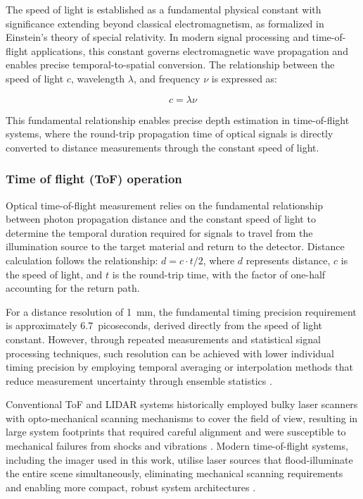\documentclass[12pt,a4paper,oneside]{report}
\begin{document}
The speed of light is established as a fundamental physical constant with significance extending beyond classical electromagnetism, as formalized in Einstein's theory of special relativity. In modern signal processing and time-of-flight applications, this constant governs electromagnetic wave propagation and enables precise temporal-to-spatial conversion. The relationship between the speed of light $c$, wavelength $\lambda$, and frequency $\nu$ is expressed as:

\begin{equation}
c = \lambda \nu
\label{eq:speed_of_light}
\end{equation}

This fundamental relationship enables precise depth estimation in time-of-flight systems, where the round-trip propagation time of optical signals is directly converted to distance measurements through the constant speed of light.

\subsubsection{Time of flight (ToF) operation}
\label{subsubsec:tof_operation}

Optical time-of-flight measurement relies on the fundamental relationship between photon propagation distance and the constant speed of light to determine the temporal duration required for signals to travel from the illumination source to the target material and return to the detector. Distance calculation follows the relationship: $d = c \cdot t/2$, where $d$ represents distance, $c$ is the speed of light, and $t$ is the round-trip time, with the factor of one-half accounting for the return path.

For a distance resolution of 1~mm, the fundamental timing precision requirement is approximately 6.7~picoseconds, derived directly from the speed of light constant. However, through repeated measurements and statistical signal processing techniques, such resolution can be achieved with lower individual timing precision by employing temporal averaging or interpolation methods that reduce measurement uncertainty through ensemble statistics .

Conventional ToF and LIDAR systems historically employed bulky laser scanners with opto-mechanical scanning mechanisms to cover the field of view, resulting in large system footprints that required careful alignment and were susceptible to mechanical failures from shocks and vibrations \cite{piron2020}. Modern time-of-flight systems, including the imager used in this work, utilise laser sources that flood-illuminate the entire scene simultaneously, eliminating mechanical scanning requirements and enabling more compact, robust system architectures \cite{piron2020}.
\end{document}
